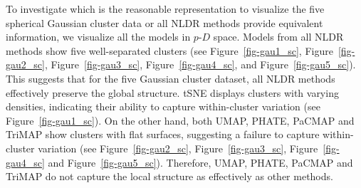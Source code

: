 \documentclass[
  12pt]{article}
\newcommand\pD{$p\text{-}D$}
\begin{document}
To investigate which is the reasonable representation to visualize the
five spherical Gaussian cluster data or all NLDR methods provide
equivalent information, we visualize all the models in \pD{} space.
Models from all NLDR methods show five well-separated clusters (see
Figure~\ref{fig-gau1_sc}, Figure~\ref{fig-gau2_sc},
Figure~\ref{fig-gau3_sc}, Figure~\ref{fig-gau4_sc}, and
Figure~\ref{fig-gau5_sc}). This suggests that for the five Gaussian
cluster dataset, all NLDR methods effectively preserve the global
structure. tSNE displays clusters with varying densities, indicating
their ability to capture within-cluster variation (see
Figure~\ref{fig-gau1_sc}). On the other hand, both UMAP, PHATE, PaCMAP
and TriMAP show clusters with flat surfaces, suggesting a failure to
capture within-cluster variation (see Figure~\ref{fig-gau2_sc},
Figure~\ref{fig-gau3_sc}, Figure~\ref{fig-gau4_sc} and
Figure~\ref{fig-gau5_sc}). Therefore, UMAP, PHATE, PaCMAP and TriMAP do
not capture the local structure as effectively as other methods.
\end{document}
